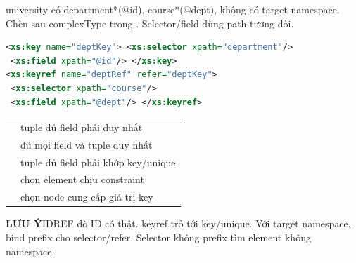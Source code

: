 \documentclass[a4paper]{article}
\newcommand{\sqlfont}{\ttfamily}
\newcommand{\bodyfontsize}{5.55}
\newcommand{\bodyleading}{5.2}
\newcommand{\bodylineskiplimit}{-2pt}
\newcommand{\bodystyle}{%
  \fontsize{\bodyfontsize}{\bodyleading}\selectfont\setlength{\lineskiplimit}{\bodylineskiplimit}\RaggedRight
  \setlength{\abovedisplayskip}{.5pt}\setlength{\belowdisplayskip}{.5pt}%
  \setlength{\abovedisplayshortskip}{.3pt}\setlength{\belowdisplayshortskip}{.3pt}}
\newenvironment{topicblock}
  {\par\bodystyle}
  {\par}
\newcommand{\note}[4]{\par\nointerlineskip\vspace{.25pt}\begingroup\setlength{\fboxsep}{0.1pt}%
  \noindent\colorbox{#1}{\parbox{\dimexpr\linewidth-2\fboxsep\relax}{%
    \RaggedRight\textcolor{#2}{\textbf{#3}}\enspace #4}}%
  \endgroup\par\nointerlineskip\vspace{.25pt}}
\newcommand{\trap}[1]{\note{warningbg}{warning}{LƯU Ý}{#1}}
\newcommand{\sql}[1]{{\sqlfont\color{sqltext}\detokenize{#1}}}
\newlength{\sheetwidth}
\newenvironment{sheetcolumns}[1]
  {\noindent\begin{minipage}[t]{#1\sheetwidth}\vspace{0pt}\bodystyle\ignorespaces}
  {\end{minipage}\par}
\begin{document}
\begin{sheetcolumns}{.272}
\begin{topicblock}
university có department*(@id), course*(@dept), không có target namespace. Chèn sau complexType trong \sql{xs:element}. Selector/field dùng path tương đối.
\begin{lstlisting}[style=Plaincode,language=XML]
<xs:key name="deptKey"> <xs:selector xpath="department"/>
 <xs:field xpath="@id"/> </xs:key>
<xs:keyref name="deptRef" refer="deptKey">
 <xs:selector xpath="course"/>
 <xs:field xpath="@dept"/> </xs:keyref>
\end{lstlisting}
\par\begin{tabular}{@{}ll@{}}
\sql{xs:unique} & tuple đủ field phải duy nhất\\
\sql{xs:key} & đủ mọi field và tuple duy nhất\\
\sql{xs:keyref} & tuple đủ field phải khớp key/unique\\
\sql{xs:selector} & chọn element chịu constraint\\
\sql{xs:field} & chọn node cung cấp giá trị key
\end{tabular}\par
\trap{IDREF dò ID có thật. keyref trỏ tới key/unique. Với target namespace, bind prefix cho selector/refer. Selector không prefix tìm element không namespace.}
\end{topicblock}


\end{sheetcolumns}
\end{document}
